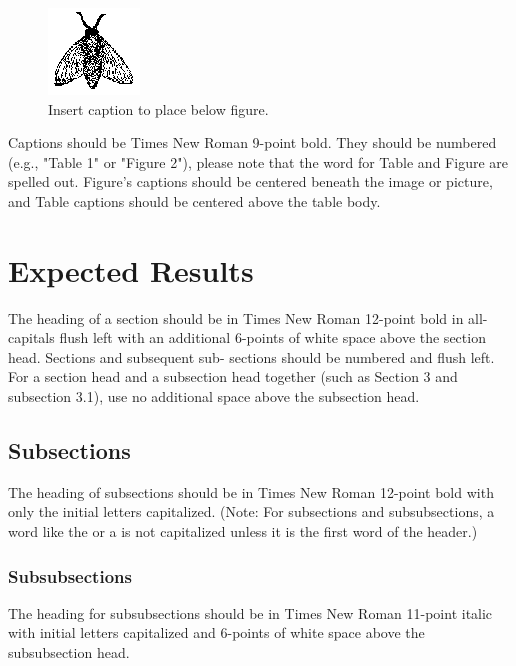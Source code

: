 \documentclass[acmtog, authorversion]{acmart}
\begin{document}
\begin{figure}
    \centering
  \includegraphics{fly2.eps}
  \caption{Insert caption to place below figure.}
  \label{fig:abc}
\end{figure}

Captions should be Times New Roman 9-point bold.  They should be numbered (e.g., "Table 1" or "Figure 2"), please note that the word for Table and Figure are spelled out. Figure's captions should be centered beneath the image or picture, and Table captions should be centered above the table body.

\section{Expected Results}
The heading of a section should be in Times New Roman 12-point bold in all-capitals flush left with an additional 6-points of white space above the section head.  Sections and subsequent sub- sections should be numbered and flush left. For a section head and a subsection head together (such as Section 3 and subsection 3.1), use no additional space above the subsection head.

\subsection{Subsections}
The heading of subsections should be in Times New Roman 12-point bold with only the initial letters capitalized. (Note: For subsections and subsubsections, a word like the or a is not capitalized unless it is the first word of the header.)

\subsubsection{Subsubsections}
The heading for subsubsections should be in Times New Roman 11-point italic with initial letters capitalized and 6-points of white space above the subsubsection head.
\end{document}
